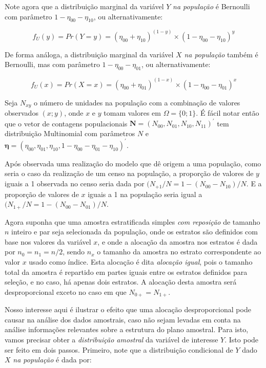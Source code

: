 \documentclass[
  12pt,
  brazilian,
]{book}
\theoremstyle{definition}
\theoremstyle{definition}
\theoremstyle{definition}
\theoremstyle{definition}
\theoremstyle{remark}
\begin{document}
Note agora que a distribuição marginal da variável \(Y\) \emph{na população} é
Bernoulli com parâmetro \(1 - \eta_{00} - \eta_{10}\), ou alternativamente:

\begin{equation}
 f_U (y) = Pr( Y = y ) = (\eta_{00} + \eta_{10})^{(1-y)} \times (1 - \eta_{00} - \eta_{10})^y
\end{equation}

De forma análoga, a distribuição marginal da variável \(X\) \emph{na população} também
é Bernoulli, mas com parâmetro \(1 - \eta_{00} - \eta_{01}\), ou alternativamente:

\begin{equation}
 f_U (x) = Pr( X = x ) = (\eta_{00} + \eta_{01})^{(1-x)} \times (1 - \eta_{00} - \eta_{01})^x
\end{equation}

Seja \(N_{xy}\) o número de unidades na população com a combinação de valores
observados \((x;y)\), onde \(x\) e \(y\) tomam valores em \(\Omega = \{ 0 ; 1 \}\). É
fácil notar então que o vetor de contagens populacionais
\(\mathbf{N} = ( N_{00}, N_{01}, N_{10}, N_{11} )^{\prime}\) tem distribuição
Multinomial com parâmetros \(N\) e
\(\mathbf{\eta} = (\eta_{00} , \eta_{01} , \eta_{10} , 1 - \eta_{00} - \eta_{01} - \eta_{10} )^{\prime}\).

Após observada uma realização do modelo que dê origem a uma população, como
seria o caso da realização de um censo na população, a proporção de valores de
\(y\) iguais a 1 observada no censo seria dada por
\((N_{+1} / N = 1 - (N_{00} - N_{10})/N\). E a proporção de valores de \(x\) iguais
a 1 na população seria igual a \((N_{1+} / N = 1 - (N_{00} - N_{01})/N\).

Agora suponha que uma amostra estratificada simples \emph{com reposição} de tamanho
\(n\) inteiro e par seja selecionada da população, onde os estratos são definidos
com base nos valores da variável \(x\), e onde a alocação da amostra nos estratos
é dada por \(n_0 = n_1 = n/2\), sendo \(n_x\) o tamanho da amostra no estrato
correspondente ao valor \(x\) usado como índice. Esta alocação é dita \emph{alocação
igual}, pois o tamanho total da amostra é repartido em partes iguais entre os
estratos definidos para seleção, e no caso, há apenas dois estratos. A alocação
desta amostra será desproporcional exceto no caso em que \(N_{0+} = N_{1+}\).

Nosso interesse aqui é ilustrar o efeito que uma alocação desproporcional pode
causar na análise dos dados amostrais, caso não sejam levadas em conta na
análise informações relevantes sobre a estrutura do plano amostral. Para isto,
vamos precisar obter a \emph{distribuição amostral} da variável de interesse \(Y\).
Isto pode ser feito em dois passos. Primeiro, note que a distribuição
condicional de \(Y\) dado \(X\) \emph{na população} é dada por:
\end{document}
